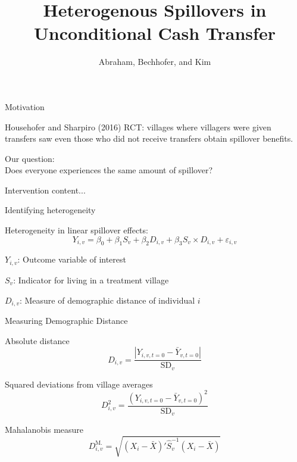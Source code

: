 \documentclass[14pt, aspectratio=169]{beamer}
\title[Heteregenous Spillovers in Unconditional Cash Transfer] %
{Heterogenous Spillovers in Unconditional Cash Transfer}
\author[Abraham, Bechhofer, and Kim] %
{Abraham, Bechhofer, and Kim }
\newenvironment{wideitemize}{\itemize\addtolength{\itemsep}{10pt}}{\enditemize}
\let\OLDitemize\itemize
\renewcommand\itemize{\OLDitemize\addtolength{\itemsep}{10pt}}
\begin{document}
\begin{frame}
  \titlepage
\end{frame}

\begin{frame}{Motivation}
\begin{wideitemize}
	\item Househofer and Sharpiro (2016) RCT: villages where villagers were given transfers saw even those who did not receive transfers obtain spillover benefits.
	\item Our question: \\ Does everyone experiences the same amount of spillover? 
\end{wideitemize}
\end{frame}

\begin{frame}{Intervention}
content...
\end{frame}

\begin{frame}{Identifying heterogeneity}
\begin{wideitemize}
	\item Heterogeneity in linear spillover effects:
	\begin{equation*} \label{eq:interaction}
	Y_{i,v} = \beta_0 + \beta_1 S_v + \beta_2 D_{i,v} + \beta_3 S_v \times  D_{i,v} + \varepsilon_{i,v}
	\end{equation*}
	
	\item $Y_{i,v}$: Outcome variable of interest 
    \item $S_v$: Indicator for living in a treatment village 
    \item $D_{i,v}$: Measure of demographic distance of individual $i$
 
\end{wideitemize}
\end{frame}

\begin{frame}{Measuring Demographic Distance}
\begin{wideitemize}
	\item Absolute distance
	$$D_{i,v}  = \frac{|Y_{i,v,t=0} - \bar Y_{v,t=0}|}{\text{SD}_v} $$
	\item Squared deviations from village averages
	$$ D^2_{i,v}= \frac{(Y_{i,v,t=0} - \bar Y_{v,t=0})^2}{\text{SD}_v} $$
	\item Mahalanobis measure
	$$D^\text{M.}_{i,v} = \sqrt{( X_i - {\bar X})' {\hat S}^{-1}_v ( X_i - {\bar X})}  $$ 
\end{wideitemize}
\end{frame}
\end{document}
